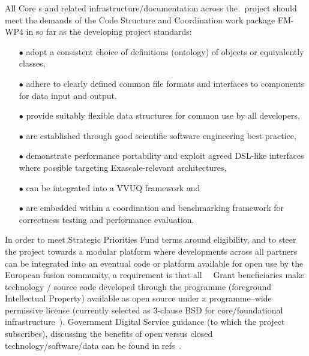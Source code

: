 All Core \Papp s and related infrastructure/documentation 
across the \nep \   project should meet the demands of the Code Structure and 
Coordination work package FM-WP4 in so far as the developing project standards:
\begin{itemize}
\item[$\bullet$] adopt a consistent choice of definitions (ontology) of 
objects or equivalently classes,
\item[$\bullet$] adhere to clearly defined common file formats and 
interfaces to components for data input and output.
\item[$\bullet$] provide suitably flexible data structures for common 
use by all developers,
\item[$\bullet$] are established through good scientific software 
engineering best practice,
\item[$\bullet$] demonstrate performance portability and exploit agreed 
DSL-like interfaces where possible targeting Exascale-relevant architectures,
\item[$\bullet$] can be integrated into a VVUQ framework and
\item[$\bullet$] are embedded within a coordination and benchmarking 
framework for correctness testing and performance evaluation.
\end{itemize}

In order to meet Strategic Priorities Fund terms around eligibility, 
and to steer the project towards a modular platform where developments 
across all partners can be integrated into an eventual code or platform 
available for open use by the European fusion community, a requirement 
is that all \exc \ \nep \ Grant beneficiaries make technology / source 
code developed through the programme (foreground Intellectual Property) available as open 
source under a programme--wide permissive license (currently selected as 
3-clause BSD for core/foundational infrastructure~\cite{bsd3clause}). Government 
Digital Service guidance (to which the project subscribes), discussing 
the benefits of open versus closed technology/software/data can be found 
in refs~\cite{os,os2}.
